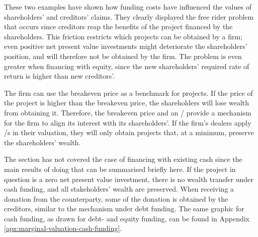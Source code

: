 \documentclass[main.tex]{subfiles}
\begin{document}
    These two examples have shown how funding costs have influenced 
    the values of shareholders' and creditors' claims.
    They clearly displayed the free rider problem that occurs
    since creditors reap the benefits of the project financed by the shareholders.
    This friction restricts which projects can be obtained by a firm;
    even positive net present value investments might deteriorate the shareholders' position,
    and will therefore not be obtained by the firm.
    The problem is even greater when financing with equity, 
    since the new shareholders' required rate of return is higher than new creditors'.
   
    The firm can use the breakeven price as a benchmark for projects. 
    If the price of the project is higher than the breakeven price, 
    the shareholders will lose wealth from obtaining it.
    Therefore, the breakeven price and an \FVA/ provide a mechanism for the firm
    to align its interest with its shareholders'.
    If the firm's dealers apply \FVA/s in their valuation,
    they will only obtain projects that, at a minimum, preserve the shareholders' wealth.
    
    The section has not covered the case of financing with existing cash
    since the main results of doing that can be summarised briefly here.
    If the project in question is a zero net present value investment, 
    there is no wealth transfer under cash funding,
    and all stakeholders' wealth are preserved.
    When receiving a donation from the counterparty, 
    some of the donation is obtained by the creditors, similar to the mechanism under debt funding.
    The same graphic for cash funding, as drawn for debt- and equity funding, can be found in Appendix
    \ref{apx:marginal-valuation-cash-funding}.
\end{document}

